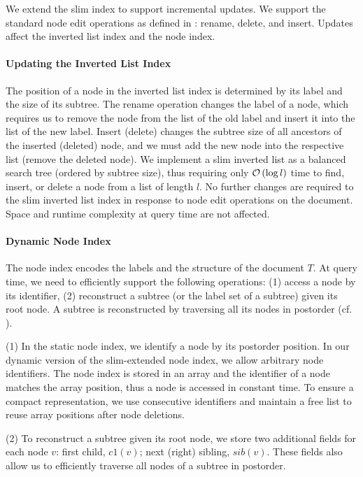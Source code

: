 
We extend the slim index to support incremental updates. We support the standard node edit operations as defined in : rename, delete, and insert. Updates affect the inverted list index and the node index.

\paragraph{Updating the Inverted List Index}

The position of a node in the inverted list index is determined by its label and the size of its subtree. The rename operation changes the label of a node, which requires us to remove the node from the list of the old label and insert it into the list of the new label. Insert (delete) changes the subtree size of all ancestors of the inserted (deleted) node, and we must add the new node into the respective list (remove the deleted node). We implement a slim inverted list as a balanced search tree (ordered by subtree size), thus requiring only $\mathcal{O} \left( \log l \right)$ time to find, insert, or delete a node from a list of length $l$. No further changes are required to the slim inverted list index in response to node edit operations on the document. Space and runtime complexity at query time are not affected.

\paragraph{Dynamic Node Index}

The node index encodes the labels and the structure of the document $T$. At query time, we need to efficiently support the following operations: (1) access a node by its identifier, (2) reconstruct a subtree (or the label set of a subtree) given its root node. A subtree is reconstructed by traversing all its nodes in postorder (cf. ).

(1) In the static node index, we identify a node by its postorder position. In our dynamic version of the slim-extended node index, we allow arbitrary node identifiers. The node index is stored in an array and the identifier of a node matches the array position, thus a node is accessed in constant time. To ensure a compact representation, we use consecutive identifiers and maintain a free list to reuse array positions after node deletions.

(2) To reconstruct a subtree given its root node, we
store two additional fields for each node $v$: first child, $c1 \left( v \right)$; next (right) sibling, $sib \left( v \right)$. These fields also allow us to efficiently traverse all nodes of a subtree in postorder.

